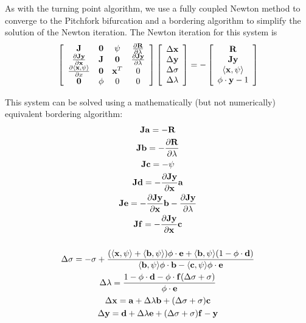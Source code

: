 As with the turning point algorithm, we use a fully coupled Newton method to converge to the Pitchfork bifurcation and a bordering algorithm to simplify the solution of the Newton iteration. The Newton iteration for this system is
\begin{equation}
\label{eq:pfn}
\left[\begin{array}{cccc}
{\bf J} & {\bf 0} & \psi & \frac{\partial {\bf R}}{\partial \lambda} \\
\frac{\partial {\bf J} {\bf y}}{\partial {\bf x}} & {\bf J} & {\bf 0} & \frac{\partial {\bf J} {\bf y}}{\partial \lambda} \\
\frac{\partial \langle {\bf x} , \psi \rangle}{\partial x} & {\bf 0} & {\bf x}^T & 0 \\
{\bf 0} & \phi & 0 & 0
\end{array}\right]
\left[\begin{array}{c}
\Delta{\bf x} \\
\Delta{\bf y} \\
\Delta\sigma \\
\Delta\lambda
\end{array}\right]
= -
\left[\begin{array}{c}
{\bf R} \\
{\bf J} {\bf y} \\
\langle {\bf x} , \psi \rangle \\
\phi \cdot {\bf y} - 1
\end{array}\right]
\end{equation}

This system can be solved using a mathematically (but not numerically) equivalent bordering algorithm:
\begin{gather}
{\bf J} {\bf a} = -{\bf R} \label{eq:pfa}\\
{\bf J} {\bf b} = -\frac{\partial {\bf R}}{\partial \lambda} \label{eq:pfb}\\
{\bf J} {\bf c} = -\psi \label{eq:pfc}\\
{\bf J} {\bf d} = -\frac{\partial {\bf J} {\bf y}}{\partial {\bf x}} {\bf a} \label{eq:pfd}\\
{\bf J} {\bf e} = -\frac{\partial {\bf J} {\bf y}}{\partial {\bf x}} {\bf b} -  \frac{\partial {\bf J} {\bf y}}{\partial \lambda} \label{eq:pfe}\\
{\bf J} {\bf f} = -\frac{\partial {\bf J} {\bf y}}{\partial {\bf x}} {\bf c} \label{eq:pff} \\
\nonumber \\
\Delta\sigma = -\sigma +  {{(\langle {\bf x} , \psi \rangle + \langle {\bf b} , \psi \rangle})
\phi \cdot {\bf e} + \langle {\bf b} , \psi \rangle (1 - \phi \cdot {\bf d})
\over{\langle  {\bf b}, \psi \rangle \phi \cdot  {\bf b}- \langle  {\bf c}, \psi \rangle \phi \cdot  {\bf e}}} \\
\Delta\lambda = {{1 - \phi \cdot {\bf d} - \phi \cdot {\bf f} (\Delta\sigma + \sigma)}
\over {\phi \cdot  {\bf e}}} \\
\Delta{\bf x} = {\bf a} + \Delta\lambda {\bf b} + (\Delta\sigma + \sigma) {\bf c} \\
\Delta{\bf y} = {\bf d} + \Delta\lambda {\bf e} + (\Delta\sigma + \sigma) {\bf f} - {\bf y} 
\end{gather}

